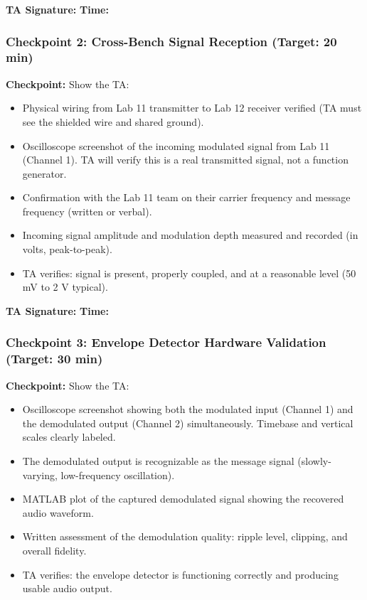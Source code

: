 \documentclass[11pt,letterpaper]{article}
\providecommand{\cpECE}[1]{\textcolor{OliveGreen}{\textbf{Checkpoint:} #1}}
\begin{document}
\vspace{0.3cm}
\textbf{TA Signature:} \underline{\hspace{2.5cm}} \quad \textbf{Time:} \underline{\hspace{1.5cm}}

\vspace{0.5cm}

\subsubsection*{Checkpoint 2: Cross-Bench Signal Reception (Target: 20 min)}

\cpECE{Show the TA:}
\begin{itemize}
    \item[$\square$] Physical wiring from Lab 11 transmitter to Lab 12 receiver verified (TA must see the shielded wire and shared ground).
    \item[$\square$] Oscilloscope screenshot of the incoming modulated signal from Lab 11 (Channel 1). TA will verify this is a real transmitted signal, not a function generator.
    \item[$\square$] Confirmation with the Lab 11 team on their carrier frequency and message frequency (written or verbal).
    \item[$\square$] Incoming signal amplitude and modulation depth measured and recorded (in volts, peak-to-peak).
    \item[$\square$] TA verifies: signal is present, properly coupled, and at a reasonable level (50 mV to 2 V typical).
\end{itemize}

\vspace{0.3cm}
\textbf{TA Signature:} \underline{\hspace{2.5cm}} \quad \textbf{Time:} \underline{\hspace{1.5cm}}

\vspace{0.5cm}

\subsubsection*{Checkpoint 3: Envelope Detector Hardware Validation (Target: 30 min)}

\cpECE{Show the TA:}
\begin{itemize}
    \item[$\square$] Oscilloscope screenshot showing both the modulated input (Channel 1) and the demodulated output (Channel 2) simultaneously. Timebase and vertical scales clearly labeled.
    \item[$\square$] The demodulated output is recognizable as the message signal (slowly-varying, low-frequency oscillation).
    \item[$\square$] MATLAB plot of the captured demodulated signal showing the recovered audio waveform.
    \item[$\square$] Written assessment of the demodulation quality: ripple level, clipping, and overall fidelity.
    \item[$\square$] TA verifies: the envelope detector is functioning correctly and producing usable audio output.
\end{itemize}
\end{document}
